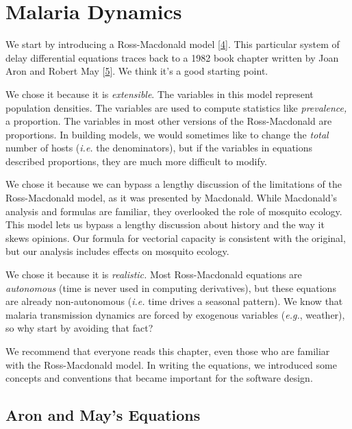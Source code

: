 \documentclass[
]{book}
\begin{document}
\hypertarget{malaria-dynamics}{%
\chapter{Malaria Dynamics}\label{malaria-dynamics}}

We start by introducing a Ross-Macdonald model {[}\protect\hyperlink{ref-SmithDL2012_RossMacdonald}{4}{]}.
This particular system of delay differential equations traces back to a 1982 book chapter written by Joan Aron and Robert May {[}\protect\hyperlink{ref-AronJL1982PopulationDynamics}{5}{]}. We think it's a good starting point.

We chose it because it is \emph{extensible}. The variables in this model represent population densities. The variables are used to compute statistics like \emph{prevalence,} a proportion. The variables in most other versions of the Ross-Macdonald are proportions. In building models, we would sometimes like to change the \emph{total} number of hosts (\emph{i.e.} the denominators), but if the variables in equations described proportions, they are much more difficult to modify.

We chose it because we can bypass a lengthy discussion of the limitations of the Ross-Macdonald model, as it was presented by Macdonald. While Macdonald's analysis and formulas are familiar, they overlooked the role of mosquito ecology. This model lets us bypass a lengthy discussion about history and the way it skews opinions. Our formula for vectorial capacity is consistent with the original, but our analysis includes effects on mosquito ecology.

We chose it because it is \emph{realistic.} Most Ross-Macdonald equations are \emph{autonomous} (time is never used in computing derivatives), but these equations are already non-autonomous (\emph{i.e.} time drives a seasonal pattern). We know that malaria transmission dynamics are forced by exogenous variables (\emph{e.g.}, weather), so why start by avoiding that fact?

We recommend that everyone reads this chapter, even those who are familiar with the Ross-Macdonald model. In writing the equations, we introduced some concepts and conventions that became important for the software design.

\hypertarget{aron-and-mays-equations}{%
\section{Aron and May's Equations}\label{aron-and-mays-equations}}
\end{document}
